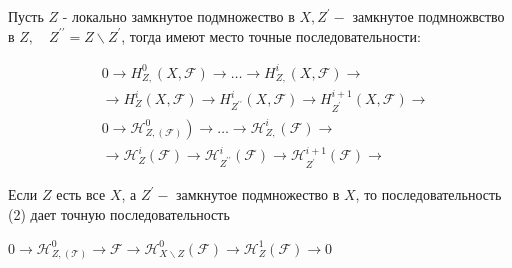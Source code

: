 \documentclass[10pt]{article}
\begin{document}
Пусть $Z$ - локально замкнутое подмножество в $X, Z^{\prime}-$ замкнутое подмножвство в $Z, \quad Z^{\prime \prime}=Z \backslash Z^{\prime}$, тогда имеют место точные последовательности:



\[

\begin{aligned}

& 0 \longrightarrow H_{Z,}^{0}(X, \mathscr{F}) \longrightarrow \ldots \longrightarrow H_{Z,}^{i}(X, \mathscr{F}) \longrightarrow \\

& \rightarrow H_{Z}^{i}(X, \mathscr{F}) \rightarrow H_{Z^{\prime \prime}}^{i}(X, \mathscr{F}) \rightarrow H_{Z^{\prime}}^{i+1}(X, \mathscr{F}) \longrightarrow \\

& \left.0 \longrightarrow \mathscr{H}_{Z,(\mathscr{F})}^{0}\right) \longrightarrow \ldots \rightarrow \mathscr{H}_{Z,}^{i}(\mathscr{F}) \longrightarrow \\

& \longrightarrow \mathscr{H}_{Z}^{i}(\mathscr{F}) \longrightarrow \mathscr{H}_{Z^{\prime \prime}}^{i}(\mathscr{F}) \longrightarrow \mathscr{H}_{Z^{\prime}}^{i+1}(\mathscr{F}) \longrightarrow

\end{aligned}

\]



Если $Z$ есть все $X$, а $Z^{\prime}-$ замкнутое подмножество в $X$, то последовательность (2) дает точную последовательность



$0 \longrightarrow \mathscr{H}_{Z,(\mathscr{T})}^{0} \rightarrow \mathscr{F} \longrightarrow \mathscr{H}_{X \backslash Z}^{0}(\mathscr{F}) \rightarrow \mathscr{H}_{Z}^{1}(\mathscr{F}) \rightarrow 0$
\end{document}
